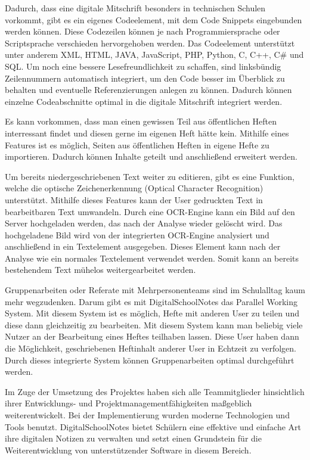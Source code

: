 \newpage

Dadurch, dass eine digitale Mitschrift besonders in technischen Schulen vorkommt, gibt es ein eigenes Codeelement, mit dem Code Snippets eingebunden werden können. Diese Codezeilen können je nach Programmiersprache oder Scriptsprache verschieden hervorgehoben werden. Das Codeelement unterstützt unter anderem XML, HTML, JAVA, JavaScript, PHP, Python, C, C++, C\# und SQL. Um noch eine bessere Lesefreundlichkeit zu schaffen, sind linksbündig Zeilennummern automatisch integriert, um den Code besser im Überblick zu behalten und eventuelle Referenzierungen anlegen zu können. Dadurch können einzelne Codeabschnitte optimal in die digitale Mitschrift integriert werden.

Es kann vorkommen, dass man einen gewissen Teil aus öffentlichen Heften interressant findet und diesen gerne im eigenen Heft hätte kein. Mithilfe eines Features ist es möglich, Seiten aus öffentlichen Heften in eigene Hefte zu importieren. Dadurch können Inhalte geteilt und anschließend erweitert werden. 

Um bereits niedergeschriebenen Text weiter zu editieren, gibt es eine Funktion, welche die optische Zeichenerkennung (Optical Character Recognition) unterstützt. Mithilfe dieses Features kann der User gedruckten Text in bearbeitbaren Text umwandeln. Durch eine OCR-Engine kann ein Bild auf den Server hochgeladen werden, das nach der Analyse wieder gelöscht wird. Das hochgeladene Bild wird von der integrierten OCR-Engine analysiert und anschließend in ein Textelement ausgegeben. Dieses Element kann nach der Analyse wie ein normales Textelement verwendet werden. Somit kann an bereits bestehendem Text mühelos weitergearbeitet werden.

Gruppenarbeiten oder Referate mit Mehrpersonenteams sind im Schulalltag kaum mehr wegzudenken. Darum gibt es mit DigitalSchoolNotes das Parallel Working System. Mit diesem System ist es möglich, Hefte mit anderen User zu teilen und diese dann gleichzeitig zu bearbeiten. Mit diesem System kann man beliebig viele Nutzer an der Bearbeitung eines Heftes teilhaben lassen. Diese User haben dann die Möglichkeit, geschriebenen Heftinhalt anderer User in Echtzeit zu verfolgen. Durch dieses integrierte System können Gruppenarbeiten optimal durchgeführt werden.

Im Zuge der Umsetzung des Projektes haben sich alle Teammitglieder hinsichtlich ihrer Entwicklungs- und Projektmanagementfähigkeiten maßgeblich weiterentwickelt. Bei der Implementierung wurden moderne Technologien und Tools benutzt. DigitalSchoolNotes bietet Schülern eine effektive und einfache Art ihre digitalen Notizen zu verwalten und setzt einen Grundstein für die Weiterentwicklung von unterstützender Software in diesem Bereich.